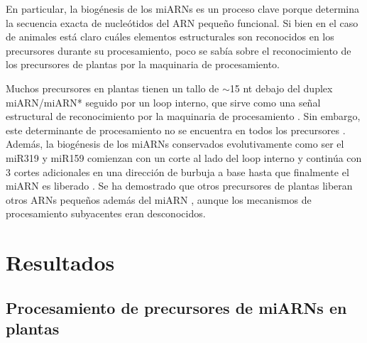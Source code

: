 En particular, la biogénesis de los miARNs es un proceso clave porque determina la secuencia exacta de nucleótidos del ARN pequeño funcional.
Si bien en el caso de animales está claro cuáles elementos estructurales son reconocidos en los precursores durante su procesamiento, poco se sabía sobre el reconocimiento de los precursores de plantas por la maquinaria de procesamiento.

Muchos precursores en plantas tienen un tallo de $\sim$15 nt debajo del duplex miARN/miARN* seguido por un loop interno, que sirve como una señal estructural de reconocimiento por la maquinaria de procesamiento \citep{pmid17369351,pmid16751099,Mateos2010,pmid20015654}.
Sin embargo, este determinante de procesamiento no se encuentra en todos los precursores \citep{Mateos2010}.
Además, la biogénesis de los miARNs conservados evolutivamente como ser el miR319 y miR159 comienzan con un corte al lado del loop interno y continúa con 3 cortes adicionales en una dirección de burbuja a base hasta que finalmente el miARN es liberado \citep{Bologna2013,pmid19850910}.
Se ha demostrado que otros precursores de plantas liberan otros ARNs pequeños además del miARN \citep{pmid15314213,pmid20696037}, aunque los mecanismos de procesamiento subyacentes eran desconocidos.

\section{Resultados} 

\subsection{Procesamiento de precursores de miARNs en plantas}

